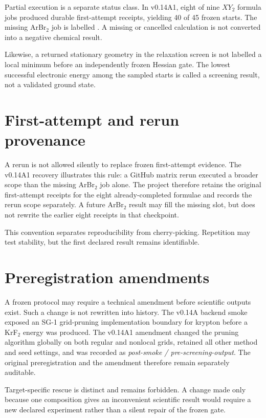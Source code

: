 Partial execution is a separate status class.  In v0.14A1, eight of nine $XY_2$ formula jobs produced durable first-attempt receipts, yielding 40 of 45 frozen starts.  The missing ArBr$_2$ job is labelled .  A missing or cancelled calculation is not converted into a negative chemical result.

Likewise, a returned stationary geometry in the relaxation screen is not labelled a local minimum before an independently frozen Hessian gate.  The lowest successful electronic energy among the sampled starts is called a screening result, not a validated ground state.

\section{First-attempt and rerun provenance}
A rerun is not allowed silently to replace frozen first-attempt evidence.  The v0.14A1 recovery illustrates this rule: a GitHub matrix rerun executed a broader scope than the missing ArBr$_2$ job alone.  The project therefore retains the original first-attempt receipts for the eight already-completed formulae and records the rerun scope separately.  A future ArBr$_2$ result may fill the missing slot, but does not rewrite the earlier eight receipts in that checkpoint.

This convention separates reproducibility from cherry-picking.  Repetition may test stability, but the first declared result remains identifiable.

\section{Preregistration amendments}
A frozen protocol may require a technical amendment before scientific outputs exist.  Such a change is not rewritten into history.  The v0.14A backend smoke exposed an SG-1 grid-pruning implementation boundary for krypton before a KrF$_2$ energy was produced.  The v0.14A1 amendment changed the pruning algorithm globally on both regular and nonlocal grids, retained all other method and seed settings, and was recorded as \emph{post-smoke / pre-screening-output}.  The original preregistration and the amendment therefore remain separately auditable.

Target-specific rescue is distinct and remains forbidden.  A change made only because one composition gives an inconvenient scientific result would require a new declared experiment rather than a silent repair of the frozen gate.

